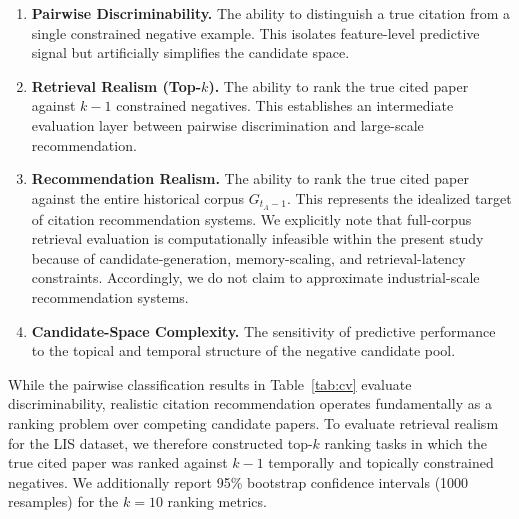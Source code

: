 \documentclass[11pt,a4paper]{article}
\begin{document}
\begin{enumerate}
    \item \textbf{Pairwise Discriminability.}
    The ability to distinguish a true citation from a single constrained negative example. This isolates feature-level predictive signal but artificially simplifies the candidate space.

    \item \textbf{Retrieval Realism (Top-\(k\)).}
    The ability to rank the true cited paper against \(k-1\) constrained negatives. This establishes an intermediate evaluation layer between pairwise discrimination and large-scale recommendation.

    \item \textbf{Recommendation Realism.}
    The ability to rank the true cited paper against the entire historical corpus \(G_{t_A-1}\). This represents the idealized target of citation recommendation systems. We explicitly note that full-corpus retrieval evaluation is computationally infeasible within the present study because of candidate-generation, memory-scaling, and retrieval-latency constraints. Accordingly, we do not claim to approximate industrial-scale recommendation systems.

    \item \textbf{Candidate-Space Complexity.}
    The sensitivity of predictive performance to the topical and temporal structure of the negative candidate pool.
\end{enumerate}

While the pairwise classification results in Table~\ref{tab:cv} evaluate discriminability, realistic citation recommendation operates fundamentally as a ranking problem over competing candidate papers. To evaluate retrieval realism for the LIS dataset, we therefore constructed top-\(k\) ranking tasks in which the true cited paper was ranked against \(k-1\) temporally and topically constrained negatives. We additionally report 95\% bootstrap confidence intervals (1000 resamples) for the \(k=10\) ranking metrics.
\end{document}
